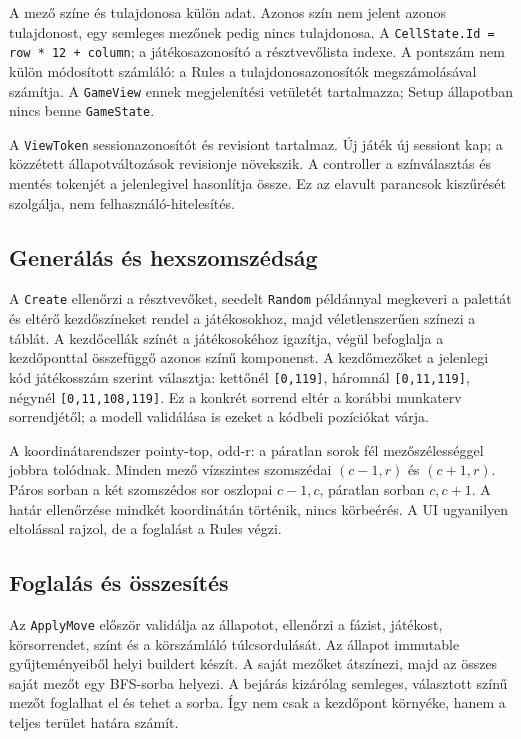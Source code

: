 \documentclass[11pt,a4paper]{article}
\newcommand{\code}[1]{\nolinkurl{#1}}
\begin{document}
A mező színe és tulajdonosa külön adat. Azonos szín nem jelent azonos tulajdonost, egy semleges mezőnek pedig nincs tulajdonosa. A \code{CellState.Id = row * 12 + column}; a játékosazonosító a résztvevőlista indexe. A pontszám nem külön módosított számláló: a Rules a tulajdonosazonosítók megszámolásával számítja. A \code{GameView} ennek megjelenítési vetületét tartalmazza; Setup állapotban nincs benne \code{GameState}.

A \code{ViewToken} sessionazonosítót és revisiont tartalmaz. Új játék új sessiont kap; a közzétett állapotváltozások revisionje növekszik. A controller a színválasztás és mentés tokenjét a jelenlegivel hasonlítja össze. Ez az elavult parancsok kiszűrését szolgálja, nem felhasználó-hitelesítés.

\subsection{Generálás és hexszomszédság}
A \code{Create} ellenőrzi a résztvevőket, seedelt \code{Random} példánnyal megkeveri a palettát és eltérő kezdőszíneket rendel a játékosokhoz, majd véletlenszerűen színezi a táblát. A kezdőcellák színét a játékosokéhoz igazítja, végül befoglalja a kezdőponttal összefüggő azonos színű komponenst. A kezdőmezőket a jelenlegi kód játékosszám szerint választja: kettőnél \code{[0,119]}, háromnál \code{[0,11,119]}, négynél \code{[0,11,108,119]}. Ez a konkrét sorrend eltér a korábbi munkaterv sorrendjétől; a modell validálása is ezeket a kódbeli pozíciókat várja.

A koordinátarendszer pointy-top, odd-r: a páratlan sorok fél mezőszélességgel jobbra tolódnak. Minden mező vízszintes szomszédai $(c-1,r)$ és $(c+1,r)$. Páros sorban a két szomszédos sor oszlopai $c-1,c$, páratlan sorban $c,c+1$. A határ ellenőrzése mindkét koordinátán történik, nincs körbeérés. A UI ugyanilyen eltolással rajzol, de a foglalást a Rules végzi.

\subsection{Foglalás és összesítés}
Az \code{ApplyMove} először validálja az állapotot, ellenőrzi a fázist, játékost, körsorrendet, színt és a körszámláló túlcsordulását. Az állapot immutable gyűjteményeiből helyi buildert készít. A saját mezőket átszínezi, majd az összes saját mezőt egy BFS-sorba helyezi. A bejárás kizárólag semleges, választott színű mezőt foglalhat el és tehet a sorba. Így nem csak a kezdőpont környéke, hanem a teljes terület határa számít.
\end{document}
